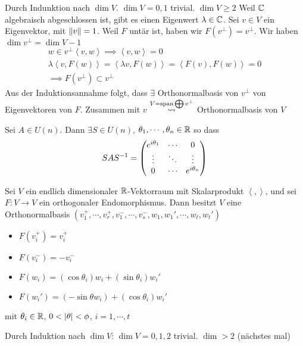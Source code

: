 \begin{Bew}
  Durch Indunktion nach $\dim V$. $\dim V=0,1$ trivial. $\dim V\geq 2$ Weil $\mathbb{C}$ algebraisch abgeschlossen ist, gibt es einen Eigenwert $\lambda\in\mathbb{C}$. Sei $v\in V$ ein Eigenvektor, mit $\left\| v \right\|=1$. Weil $F$ untär ist, haben wir $F(v^\perp)=v^\perp$. Wir haben $\dim v^\perp =\dim V-1$
  \begin{align*}
    w\in v^\perp \left\langle v,w \right\rangle \implies \left\langle v,w \right\rangle = 0\\
    \lambda\left\langle v,F(w) \right\rangle = \left\langle \lambda v,F(w) \right\rangle=\left\langle F(v),F(w) \right\rangle=0\\
    \implies F(v^\perp)\subset v^\perp
  \end{align*}
  Aus der Induktionsannahme folgt, dass $\exists$ Orthonormalbasis von $v^\perp$ von Eigenvektoren von $F$. Zusammen mit $v$ $\stackrel{V=\operatorname{span}\bigoplus v^\perp}{\rightsquigarrow}$ Orthonormalbasis von $V$
\end{Bew}
\begin{Kor}
  Sei $A\in U(n)$. Dann $\exists S\in U(n)$, $\theta_1,\cdots,\theta_n\in\mathbb{R}$ so dass
  \[SAS^{-1}=\begin{pmatrix}e^{i\theta_1}&\cdots&0\\ \vdots&\ddots&\vdots\\0&\cdots&e^{i\theta_n}\end{pmatrix}\]
\end{Kor}
\begin{Prop}
  Sei $V$ ein endlich dimensionaler $\mathbb{R}$-Vektorraum mit Skalarprodukt $\left\langle , \right\rangle$, und sei $F:V\to V$ ein orthogonaler Endomorphismus. Dann besitzt $V$ eine Orthonormalbasis $\left( v_1^+,\cdots,v_r^+,v_1^-,\cdots,v_s^-,w_1,w_1',\cdots,w_t,w_t' \right)$
  \begin{itemize}
    \item $F(v^+_i)=v_i^+$
    \item $F(v_i^-)=-v_i^-$
    \item $F(w_i)=(\cos\theta_i)w_i+(\sin\theta_i)w_i'$
    \item $F(w_i')=(-\sin\theta w_i)+(\cos\theta_i)w_i'$
  \end{itemize}
  mit $\theta_i\in\mathbb{R}$, $0<\left| \theta \right|<\phi$, $i=1,\cdots,t$
\end{Prop}
\begin{Bew}
  Durch Induktion nach $\dim V$: $\dim V=0,1,2$ trivial. $\dim >2$ (nächstes mal)
\end{Bew}
